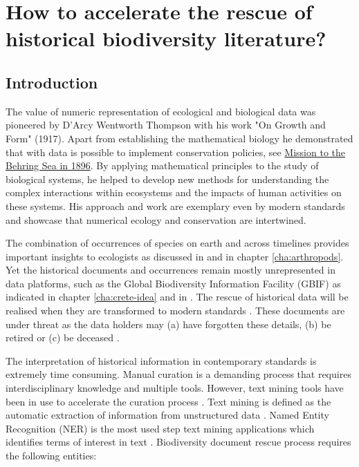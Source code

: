 % 
% 


\chapter{How to accelerate the rescue of historical biodiversity literature?}
\label{cha:deco}


\section{Introduction}
\label{sec:deco-intro}

The value of numeric representation of ecological and biological data was pioneered by D'Arcy Wentworth Thompson
with his work "On Growth and Form" (1917). Apart from establishing the mathematical biology
he demonstrated that with data is possible to implement conservation policies, 
see \href{https://www.biodiversitylibrary.org/item/63749}{Mission to the Behring Sea in 1896}.
By applying mathematical principles to the study of biological systems,
he helped to develop new methods for understanding the complex interactions within
ecosystems and the impacts of human activities on these systems.
His approach and work are exemplary even by modern standards and showcase that 
numerical ecology and conservation are intertwined. 

The combination of occurrences of species on earth and across timelines provides 
important insights to ecologists as discussed in \textcite{bolanakis2024} and in chapter \ref{cha:arthropods}.
Yet the historical documents and occurrences remain mostly unrepresented in
data platforms, such as the Global Biodiversity Information Facility (GBIF) \parencite{noauthor_gbif_nodate}
as indicated in chapter \ref{cha:crete-idea} and in \textcite{Paragkamian2022}.
The rescue of historical data will be realised when they are transformed to
modern standards \parencite{bowker_biodiversity_2000,Paragkamian2022}.
These documents are under threat as the data holders may
(a) have forgotten these details, (b) be retired or (c) be deceased \parencite{michener_nongeospatial_1997}.

The interpretation of historical information in contemporary standards 
is extremely time consuming. 
Manual curation is a demanding process that requires interdisciplinary 
knowledge and multiple tools.
However, text mining tools have been in use to accelerate the
curation process \parencite{alex_assisted_2008}. Text mining is defined as the
automatic extraction of information from unstructured data
\parencite{hearst_untangling_1999,10.5555/1199003}.
Named Entity Recognition (NER) is the most used step text mining applications
which identifies terms of interest in text \parencite{perera_named_2020}.
Biodiversity document rescue process requires the following entities:

